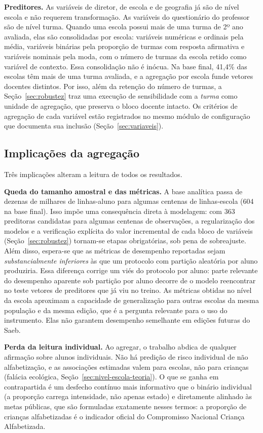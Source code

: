 \textbf{Preditores.} As variáveis de diretor, de escola e de geografia já
são de nível escola e não requerem transformação. As variáveis do
questionário do professor são de nível turma. Quando uma escola possui
mais de uma turma de 2º ano avaliada, elas são consolidadas por escola:
variáveis numéricas e ordinais pela média, variáveis binárias pela
proporção de turmas com resposta afirmativa e variáveis nominais pela moda,
com o número de turmas da escola retido como variável de contexto. Essa
consolidação não é inócua. Na base final, 41,4\% das escolas têm mais de
uma turma avaliada, e a agregação por escola funde vetores docentes
distintos. Por isso, além da retenção do
número de turmas, a Seção~\ref{sec:robustez} traz uma execução de
sensibilidade com a \emph{turma} como unidade de agregação, que preserva o
bloco docente intacto. Os critérios de agregação de cada variável estão
registrados no mesmo módulo de configuração que documenta sua inclusão
(Seção~\ref{sec:variaveis}).

\subsection{Implicações da agregação}
\label{sec:implicacoes-agregacao}

Três implicações alteram a leitura de todos os resultados.

\textbf{Queda do tamanho amostral e das métricas.} A base analítica passa
de dezenas de milhares de linhas-aluno para algumas centenas de
linhas-escola (604 na base final). Isso impõe uma consequência direta à
modelagem: com 363 preditoras candidatas para algumas centenas de
observações, a regularização dos modelos e a verificação explícita do valor
incremental de cada bloco de variáveis (Seção~\ref{sec:robustez}) tornam-se
etapas obrigatórias, sob pena de sobreajuste. Além disso,
espera-se que as métricas de desempenho reportadas sejam
\emph{substancialmente inferiores} às que um protocolo com partição
aleatória por aluno produziria. Essa diferença corrige um viés do
protocolo por aluno: parte relevante do desempenho aparente sob partição por
aluno decorre de o modelo reencontrar no teste vetores de preditores que já
viu no treino. As métricas obtidas no nível da escola aproximam a
capacidade de generalização para outras escolas da mesma população e da
mesma edição, que é a pergunta relevante para o uso do
instrumento. Elas não garantem desempenho semelhante em edições futuras do
Saeb.

\textbf{Perda da leitura individual.} Ao agregar, o trabalho abdica de
qualquer afirmação sobre alunos individuais. Não há predição de risco
individual de não alfabetização, e as associações estimadas valem para
escolas, não para crianças (falácia ecológica,
Seção~\ref{sec:nivel-escola-teoria}). O que se ganha em contrapartida é um
desfecho contínuo mais informativo que o binário individual (a proporção
carrega intensidade, não apenas estado) e diretamente alinhado às metas
públicas, que são formuladas exatamente nesses termos: a proporção de
crianças alfabetizadas é o indicador oficial do Compromisso Nacional
Criança Alfabetizada.

